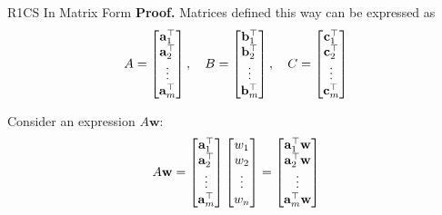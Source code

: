 \documentclass{beamer}
\begin{document}
    \begin{frame}{R1CS In Matrix Form}
        \textbf{Proof.} Matrices defined this way can be expressed as
        \vspace{-5pt}
        {\scriptsize \begin{equation*}
            A = \begin{bmatrix}
                \mathbf{a}_1^{\top} \\ \mathbf{a}_2^{\top} \\ \vdots \\ \mathbf{a}_m^{\top}
            \end{bmatrix}, \quad B = \begin{bmatrix}
                \mathbf{b}_1^{\top} \\ \mathbf{b}_2^{\top} \\ \vdots \\ \mathbf{b}_m^{\top}
            \end{bmatrix}, \quad C = \begin{bmatrix}
                \mathbf{c}_1^{\top} \\ \mathbf{c}_2^{\top} \\ \vdots \\ \mathbf{c}_m^{\top}
            \end{bmatrix}
            \vspace{-5pt}
        \end{equation*}}

        Consider an expression $A\mathbf{w}$:
        \vspace{-5pt}
        {\scriptsize \begin{equation*}
            A\mathbf{w} = \begin{bmatrix}
                \mathbf{a}_1^{\top} \\ \mathbf{a}_2^{\top} \\ \vdots \\ \mathbf{a}_m^{\top}
            \end{bmatrix}\begin{bmatrix}
                w_1 \\ w_2 \\ \vdots \\ w_n
            \end{bmatrix} = \begin{bmatrix}
                \mathbf{a}_1^{\top}\mathbf{w} \\ \mathbf{a}_2^{\top}\mathbf{w} \\ \vdots \\ \mathbf{a}_m^{\top}\mathbf{w}
            \end{bmatrix}
            \vspace{-5pt}
        \end{equation*}}


\end{frame}
\end{document}

